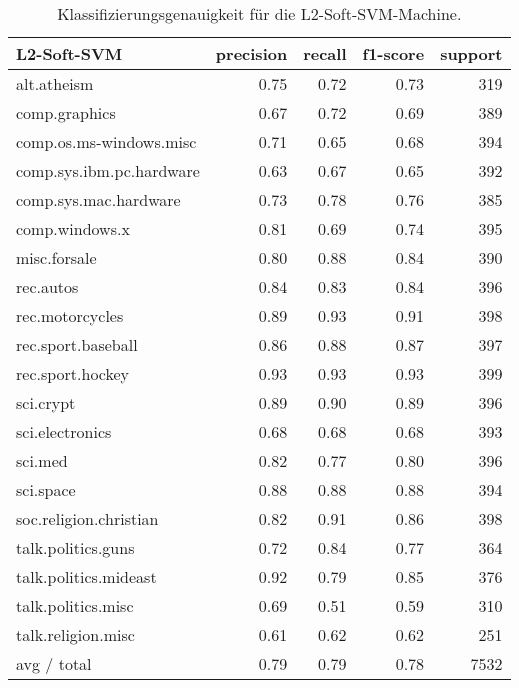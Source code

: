 \begin{table}[h!]
\centering
\begin{tabular}{|l | r | r | r | r|}
\hline
L2-Soft-SVM                    & precision  &  recall &  f1-score &   support \\
\hline
             alt.atheism       & 0.75      & 0.72      & 0.73      & 319  \\
           comp.graphics       & 0.67      & 0.72      & 0.69      & 389 \\
 comp.os.ms-windows.misc       & 0.71      & 0.65      & 0.68      & 394 \\
comp.sys.ibm.pc.hardware       & 0.63      & 0.67      & 0.65      & 392 \\
   comp.sys.mac.hardware       & 0.73      & 0.78      & 0.76      & 385 \\
          comp.windows.x       & 0.81      & 0.69      & 0.74      & 395 \\
            misc.forsale       & 0.80      & 0.88      & 0.84      & 390 \\
               rec.autos       & 0.84      & 0.83      & 0.84      & 396 \\
         rec.motorcycles       & 0.89      & 0.93      & 0.91      & 398 \\
      rec.sport.baseball       & 0.86      & 0.88      & 0.87      & 397 \\
        rec.sport.hockey       & 0.93      & 0.93      & 0.93      & 399 \\
               sci.crypt       & 0.89      & 0.90      & 0.89      & 396 \\
         sci.electronics       & 0.68      & 0.68      & 0.68      & 393 \\
                 sci.med       & 0.82      & 0.77      & 0.80      & 396 \\
               sci.space       & 0.88      & 0.88      & 0.88      & 394 \\
  soc.religion.christian       & 0.82      & 0.91      & 0.86      & 398 \\
      talk.politics.guns       & 0.72      & 0.84      & 0.77      & 364 \\
   talk.politics.mideast       & 0.92      & 0.79      & 0.85      & 376 \\
      talk.politics.misc       & 0.69      & 0.51      & 0.59      & 310 \\
      talk.religion.misc       & 0.61      & 0.62      & 0.62      & 251 \\
\hline
             avg / total       & 0.79      & 0.79      & 0.78      & 7532 \\
\hline			 
\end{tabular}
\caption{Klassifizierungsgenauigkeit für die L2-Soft-SVM-Machine.}
\label{tab:L2SoftSVM}
\end{table}

